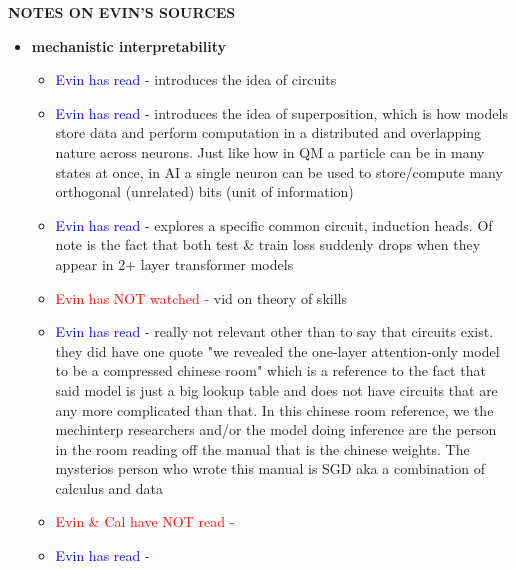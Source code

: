 \documentclass{article}
\begin{document}
\textbf{NOTES ON EVIN'S SOURCES}
\begin{itemize}
    \item \textbf{mechanistic interpretability}
    \begin{itemize}
        \item \textcolor{blue}{Evin has read -} \cite{olah2020zoom} introduces the idea of circuits
        \item \textcolor{blue}{Evin has read -} \cite{elhage2022toy} introduces the idea of superposition, which is how models store data and perform computation in a distributed and overlapping nature across neurons. Just like how in QM a particle can be in many states at once, in AI a single neuron can be used to store/compute many orthogonal (unrelated) bits (unit of information)
        \item \textcolor{blue}{Evin has read -} \cite{olsson2022context} explores a specific common circuit, induction heads. Of note is the fact that both test \& train loss suddenly drops when they appear in 2+ layer transformer models
        \item \textcolor{red}{Evin has NOT watched - } \cite{arora2023skills} vid on theory of skills
        \item \textcolor{blue}{Evin has read -} \cite{elhage2021mathematical} really not relevant other than to say that circuits exist. they did have one quote "we revealed the one-layer attention-only model to be a compressed chinese room" which is a reference to the fact that said model is just a big lookup table and does not have circuits that are any more complicated than that. In this chinese room reference, we the mechinterp researchers and/or the model doing inference are the person in the room reading off the manual that is the chinese weights. The mysterios person who wrote this manual is SGD aka a combination of calculus and data
        \item \textcolor{red}{Evin \& Cal have NOT read - }
        \item \textcolor{blue}{Evin has read -}
    \end{itemize}
    

\end{itemize}
\end{document}
